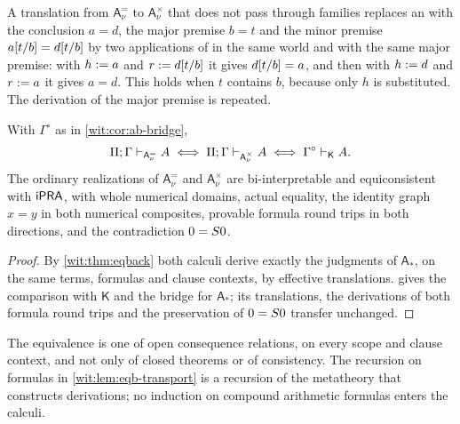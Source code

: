 \begin{remark}
\label{wit:rem:eqback-sim}
A translation from $\mathsf{A}^{=}_{\nu}$ to $\mathsf{A}^{\times}_{\nu}$ that
does not pass through families replaces an  with the
conclusion $a=d$, the major premise $b=t$ and the minor premise
$a[t/b]=d[t/b]$ by two applications of  in the
same world and with the same major premise: with $h\mathrel{:=} a$ and
$r\mathrel{:=} d[t/b]$ it gives $d[t/b]=a$, and then with $h\mathrel{:=} d$
and $r\mathrel{:=} a$ it gives $a=d$.  This holds when $t$ contains $b$, because
only $h$ is substituted.  The derivation of the major premise is repeated.
\end{remark}

\begin{corollary}
\label{wit:cor:eqback-bridge}
With $\Gamma^{\circ}$ as in \cref{wit:cor:ab-bridge},
\[
 \Pi;\Gamma\vdash_{\mathsf{A}^{=}_{\nu}}A
 \iff \Pi;\Gamma\vdash_{\mathsf{A}^{\times}_{\nu}}A
 \iff \Gamma^{\circ}\vdash_{\mathsf{K}}A .
\]
The ordinary realizations of $\mathsf{A}^{=}_{\nu}$ and
$\mathsf{A}^{\times}_{\nu}$ are bi-interpretable and equiconsistent with
$\mathsf{iPRA}$, with whole numerical domains, actual equality, the identity graph
$x=y$ in both numerical composites, provable formula round trips in both
directions, and the contradiction $0=S 0$.
\end{corollary}

\begin{proof}
By \cref{wit:thm:eqback} both calculi derive exactly the judgments of
$\mathsf{A}_{\ast}$, on the same terms, formulas and clause contexts, by
effective translations.   gives the comparison with
$\mathsf{K}$ and the bridge for $\mathsf{A}_{\ast}$; its translations, the
derivations of both formula round trips and the preservation of $0=S 0$
transfer unchanged.
\end{proof}

The equivalence is one of open consequence relations, on every scope and
clause context, and not only of closed theorems or of consistency.  The
recursion on formulas in \cref{wit:lem:eqb-transport} is a recursion of the
metatheory that constructs derivations; no induction on compound arithmetic
formulas enters the calculi.

